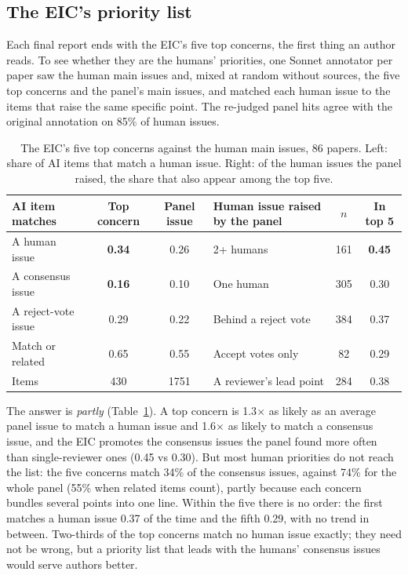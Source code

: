 \documentclass[11pt,a4paper]{article}
\begin{document}
\subsection{The EIC's priority list}\label{sec:priority}
Each final report ends with the EIC's five top concerns, the first thing an author reads. To see
whether they are the humans' priorities, one Sonnet annotator per paper saw the human main
issues and, mixed at random without sources, the five top concerns and the panel's main issues,
and matched each human issue to the items that raise the same specific point. The re-judged
panel hits agree with the original annotation on 85\% of human issues.

\begin{table}[h]
\centering
\small
\caption{The EIC's five top concerns against the human main issues, 86 papers. Left: share of
AI items that match a human issue. Right: of the human issues the panel raised, the share that
also appear among the top five.}\label{tab:priority}
\setlength{\tabcolsep}{3pt}
\begin{tabular}{lcc@{\qquad}lcc}
\toprule
AI item matches & Top concern & Panel issue & Human issue raised by the panel & $n$ & In top 5\\
\midrule
A human issue & \textbf{0.34} & 0.26 & 2+ humans & 161 & \textbf{0.45}\\
A consensus issue & \textbf{0.16} & 0.10 & One human & 305 & 0.30\\
A reject-vote issue & 0.29 & 0.22 & Behind a reject vote & 384 & 0.37\\
Match or related & 0.65 & 0.55 & Accept votes only & 82 & 0.29\\
Items & 430 & 1751 & A reviewer's lead point & 284 & 0.38\\
\bottomrule
\end{tabular}
\end{table}

The answer is \emph{partly} (Table~\ref{tab:priority}). A top concern is 1.3$\times$ as likely as
an average panel issue to match a human issue and 1.6$\times$ as likely to match a consensus
issue, and the EIC promotes the consensus issues the panel found more often than single-reviewer
ones (0.45 vs 0.30). But most human priorities do not reach the list: the five concerns match
34\% of the consensus issues, against 74\% for the whole panel (55\% when related items count),
partly because each concern bundles several points into one line. Within the five there is no
order: the first matches a human issue 0.37 of the time and the fifth 0.29, with no trend in
between. Two-thirds of the top concerns match no human issue exactly; they need not be wrong, but
a priority list that leads with the humans' consensus issues would serve authors better.
\end{document}
